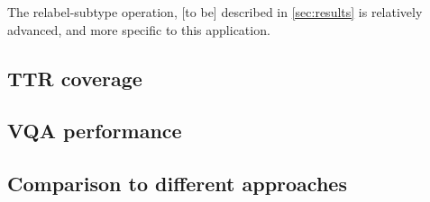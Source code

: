 The relabel-subtype operation, [to be] described in \autoref{sec:results} is relatively advanced, and more specific to this application.



\subsection{TTR coverage}



\subsection{VQA performance}



\subsection{Comparison to different approaches}



